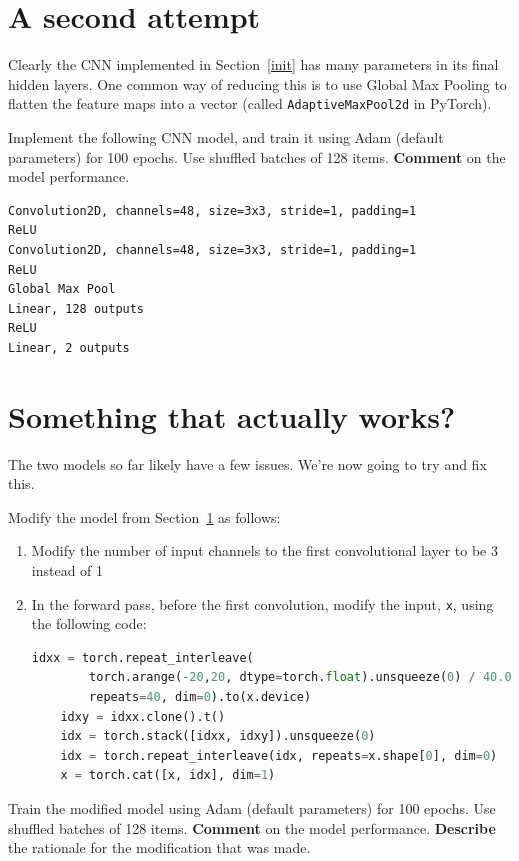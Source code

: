 \documentclass[a4paper]{article}
\begin{document}
\section{A second attempt}\label{second}

Clearly the CNN implemented in Section~\ref{init} has many parameters in its final hidden layers. One common way of reducing this is to use Global Max Pooling to flatten the feature maps into a vector (called \verb|AdaptiveMaxPool2d| in PyTorch).

\begin{tcolorbox}[title=2.1 A simple CNN with global pooling (1 mark)]
Implement the following CNN model, and train it using Adam (default parameters) for 100 epochs. Use shuffled batches of 128 items. \textbf{Comment} on the model performance.

\begin{lstlisting}
Convolution2D, channels=48, size=3x3, stride=1, padding=1
ReLU
Convolution2D, channels=48, size=3x3, stride=1, padding=1
ReLU
Global Max Pool
Linear, 128 outputs
ReLU
Linear, 2 outputs
\end{lstlisting}
\end{tcolorbox}

\section{Something that actually works?}\label{final}
The two models so far likely have a few issues. We're now going to try and fix this.

\begin{tcolorbox}[title=3.1 Let's regress (2 marks)]
Modify the model from Section~\ref{second} as follows:
\begin{enumerate}
	\item Modify the number of input channels to the first convolutional layer to be 3 instead of 1
	\item In the forward pass, before the first convolution, modify the input, \verb|x|, using the following code:
	\begin{lstlisting}[language=Python]
    idxx = torch.repeat_interleave(
        torch.arange(-20,20, dtype=torch.float).unsqueeze(0) / 40.0, 
        repeats=40, dim=0).to(x.device)
    idxy = idxx.clone().t()
    idx = torch.stack([idxx, idxy]).unsqueeze(0)
    idx = torch.repeat_interleave(idx, repeats=x.shape[0], dim=0)
    x = torch.cat([x, idx], dim=1)
	\end{lstlisting}
\end{enumerate}
Train the modified model using Adam (default parameters) for 100 epochs. Use shuffled batches of 128 items. \textbf{Comment} on the model performance. \textbf{Describe} the rationale for the modification that was made.
\end{tcolorbox}
\end{document}
